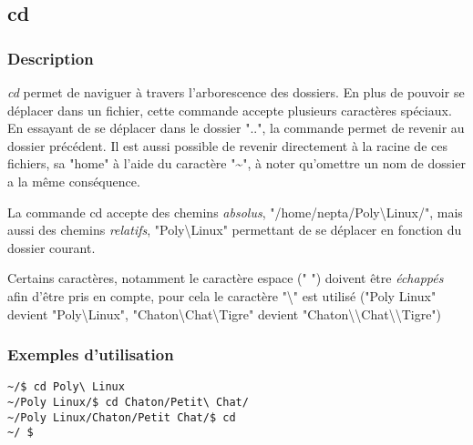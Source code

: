 \subsection*{cd}
\subsubsection*{Description}
\emph{cd} permet de naviguer à travers l'arborescence des dossiers.
En plus de pouvoir se déplacer dans un fichier, cette commande accepte plusieurs caractères spéciaux.
En essayant de se déplacer dans le dossier "..", la commande permet de revenir au dossier précédent.
Il est aussi possible de revenir directement à la racine de ces fichiers, sa "home" à l'aide du caractère "\~{}", à noter qu'omettre un nom de dossier a la même conséquence.

La commande cd accepte des chemins \emph{absolus}, "/home/nepta/Poly\textbackslash Linux/", mais aussi des chemins \emph{relatifs}, "Poly\textbackslash \textvisiblespace Linux" permettant de se déplacer en fonction du dossier courant.

Certains caractères, notamment le caractère espace (" ") doivent être \emph{échappés} afin d'être pris en compte, pour cela le caractère "\textbackslash" est utilisé ("Poly Linux" devient "Poly\textbackslash Linux",
"Chaton\textbackslash Chat\textbackslash Tigre" devient "Chaton\textbackslash \textbackslash Chat\textbackslash \textbackslash Tigre")

\subsubsection*{Exemples d'utilisation}

\begin{lstlisting}
~/$ cd Poly\ Linux
~/Poly Linux/$ cd Chaton/Petit\ Chat/
~/Poly Linux/Chaton/Petit Chat/$ cd
~/ $ 
\end{lstlisting}
